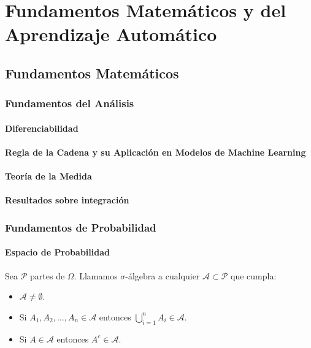
\chapter{Fundamentos Matemáticos y del Aprendizaje Automático}

\section{Fundamentos Matemáticos}
\subsection{Fundamentos del Análisis}
\subsubsection{Diferenciabilidad}
\subsubsection{Regla de la Cadena y su Aplicación en Modelos de Machine Learning}
\subsubsection{Teoría de la Medida}
\subsubsection{Resultados sobre integración}

\subsection{Fundamentos de Probabilidad}

\subsubsection{Espacio de Probabilidad}
\begin{definition}
Sea $\mathcal{P}$ partes de $\Omega$. Llamamos $\sigma$-álgebra a cualquier $\mathcal{A} \subset \mathcal{P}$ que cumpla:
\begin{itemize}
\item $ \mathcal{A} \neq \emptyset$.
\item Si $A_1, A_2, \ldots, A_n \in \mathcal{A}$ entonces $\bigcup_{i=1}^n A_i \in \mathcal{A}$.
\item Si $A \in \mathcal{A}$ entonces $A^c \in \mathcal{A}$.
\end{itemize}
\end{definition}


